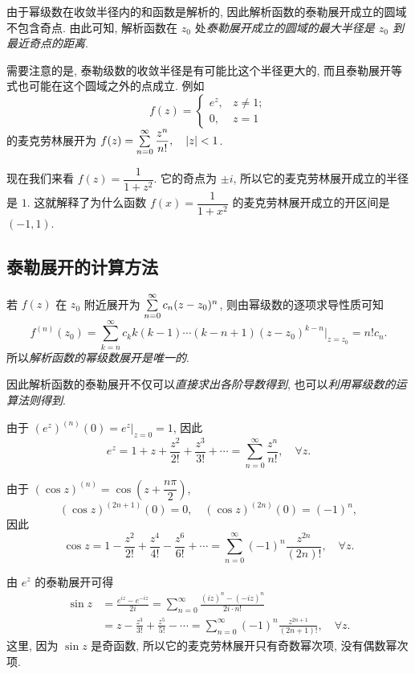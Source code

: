 \documentclass[nocolor,theme=doremi,lang=cn,11pt,chinese,twoside,openright,usesamecnt]{elegantbook}
\begin{document}
由于幂级数在收敛半径内的和函数是解析的, 因此解析函数的泰勒展开成立的圆域不包含奇点.
由此可知, 解析函数在 $z_0$ 处\emph{泰勒展开成立的圆域的最大半径是 $z_0$ 到最近奇点的距离}.

需要注意的是, 泰勒级数的收敛半径是有可能比这个半径更大的,
而且泰勒展开等式也可能在这个圆域之外的点成立.
例如 
\[f(z)=\begin{cases}
	e^z,&z\neq 1;\\
	0,&z=1
\end{cases}\]
的麦克劳林展开为 $f(z)=\sum\limits_{n=0}^\infty \dfrac{z^n}{n!},\quad |z|<1$.

现在我们来看 $f(z)=\dfrac1{1+z^2}$.
它的奇点为 $\pm i$, 所以它的麦克劳林展开成立的半径是 $1$.
这就解释了为什么函数 $f(x)=\dfrac1{1+x^2}$ 的麦克劳林展开成立的开区间是 $(-1,1)$.

\subsection{泰勒展开的计算方法}

若 $f(z)$ 在 $z_0$ 附近展开为 $\sum\limits_{n=0}^\infty c_n(z-z_0)^n$,
则由幂级数的逐项求导性质可知
\[f^{(n)}(z_0)=\sum_{k=n}^\infty c_k k(k-1)\cdots(k-n+1)(z-z_0)^{k-n}\Big|_{z=z_0}=n!c_n.\]
所以\emph{解析函数的幂级数展开是唯一的}.

因此解析函数的泰勒展开不仅可以\emph{直接求出各阶导数得到}, 也可以\emph{利用幂级数的运算法则得到}.

\begin{example}
	由于 $(e^z)^{(n)}(0)=e^z|_{z=0}=1$, 因此
	\[e^z=1+z+\frac{z^2}{2!}+\frac{z^3}{3!}+\cdots=\sum_{n=0}^\infty\frac{z^n}{n!},\quad\forall z.\]
\end{example}

\begin{example}
	由于 $\displaystyle(\cos z)^{(n)}=\cos\left(z+\dfrac{n\pi}2\right)$,
		\[(\cos z)^{(2n+1)}(0)=0,\quad (\cos z)^{(2n)}(0)=(-1)^n,\]
	因此
		\[\cos z=1-\frac{z^2}{2!}+\frac{z^4}{4!}-\frac{z^6}{6!}+\cdots=\sum_{n=0}^\infty(-1)^n\frac{z^{2n}}{(2n)!},\quad\forall z.\]
\end{example}

\begin{example}
	由 $e^z$ 的泰勒展开可得
	\begin{align*}
		\sin z&=\frac{e^{iz}-e^{-iz}}{2i}
		{=\sum_{n=0}^\infty\frac{(iz)^n-(-iz)^n}{2i\cdot n!}}\\
		&=z-\frac{z^3}{3!}+\frac{z^5}{5!}-\cdots
		=\sum_{n=0}^\infty(-1)^n\frac{z^{2n+1}}{(2n+1)!},\quad\forall z.
	\end{align*}
		这里, 因为 $\sin z$ 是奇函数, 所以它的麦克劳林展开只有奇数幂次项, 没有偶数幂次项.
\end{example}
\end{document}
